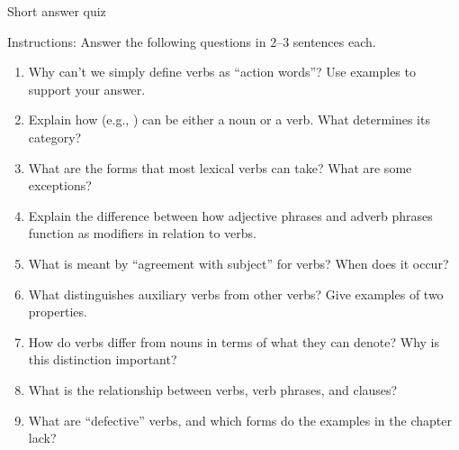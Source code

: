\begin{tblslineshorizontal}{Short answer quiz}

Instructions: Answer the following questions in 2--3 sentences each.

\begin{enumerate}[noitemsep]
    \item Why can't we simply define verbs as \enquote{action words}? Use examples to support your answer.
    \item Explain how (e.g., ) can be either a noun or a verb. What determines its category?
    \item What are the forms that most lexical verbs can take? What are some exceptions?
    \item Explain the difference between how adjective phrases and adverb phrases function as modifiers in relation to verbs.
    \item What is meant by \enquote{agreement with subject} for verbs? When does it occur?
    \item What distinguishes auxiliary verbs from other verbs? Give examples of two properties.
    \item How do verbs differ from nouns in terms of what they can denote? Why is this distinction important?
    \item What is the relationship between verbs, verb phrases, and clauses?
    \item What are \enquote{defective} verbs, and which forms do the examples in the chapter lack?
\end{enumerate}

\end{tblslineshorizontal}

